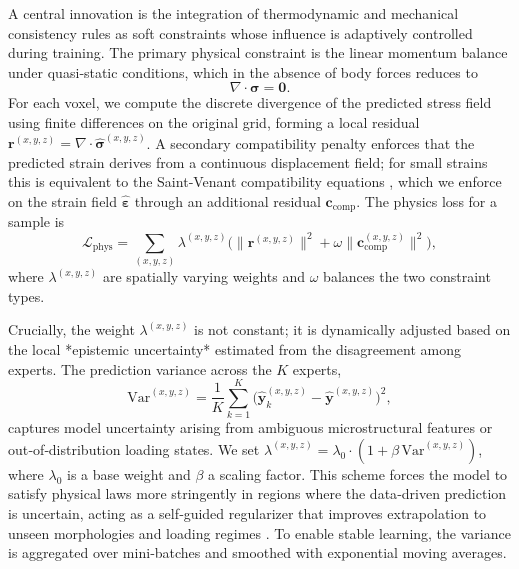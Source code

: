 \documentclass{article}
\begin{document}
A central innovation is the integration of thermodynamic and mechanical consistency rules as soft constraints whose influence is adaptively controlled during training. The primary physical constraint is the linear momentum balance under quasi‑static conditions, which in the absence of body forces reduces to
\begin{equation}
  \nabla\cdot\boldsymbol{\sigma} = \mathbf{0}.
\end{equation}
For each voxel, we compute the discrete divergence of the predicted stress field using finite differences on the original grid, forming a local residual \(\mathbf{r}^{(x,y,z)} = \nabla\cdot\hat{\boldsymbol{\sigma}}^{(x,y,z)}\). A secondary compatibility penalty enforces that the predicted strain derives from a continuous displacement field; for small strains this is equivalent to the Saint‑Venant compatibility equations \cite{bower_elasticity_2010}, which we enforce on the strain field \(\hat{\boldsymbol{\varepsilon}}\) through an additional residual \(\mathbf{c}_{\text{comp}}\). The physics loss for a sample is
\begin{equation}
  \mathcal{L}_{\text{phys}} = \sum_{(x,y,z)} \lambda^{(x,y,z)} \bigl( \|\mathbf{r}^{(x,y,z)}\|^2 + \omega \|\mathbf{c}_{\text{comp}}^{(x,y,z)}\|^2 \bigr),
\end{equation}
where \(\lambda^{(x,y,z)}\) are spatially varying weights and \(\omega\) balances the two constraint types.

Crucially, the weight \(\lambda^{(x,y,z)}\) is not constant; it is dynamically adjusted based on the local *epistemic uncertainty* estimated from the disagreement among experts. The prediction variance across the \(K\) experts,
\begin{equation}
  \text{Var}^{(x,y,z)} = \frac{1}{K}\sum_{k=1}^K \bigl(\hat{\mathbf{y}}_k^{(x,y,z)} - \hat{\mathbf{y}}^{(x,y,z)}\bigr)^2,
\end{equation}
captures model uncertainty arising from ambiguous microstructural features or out‑of‑distribution loading states. We set \(\lambda^{(x,y,z)} = \lambda_0 \cdot (1 + \beta \,\text{Var}^{(x,y,z)})\), where \(\lambda_0\) is a base weight and \(\beta\) a scaling factor. This scheme forces the model to satisfy physical laws more stringently in regions where the data‑driven prediction is uncertain, acting as a self‑guided regularizer that improves extrapolation to unseen morphologies and loading regimes \cite{yu_cosmo_2022}. To enable stable learning, the variance is aggregated over mini‑batches and smoothed with exponential moving averages.
\end{document}
